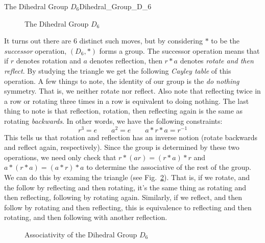 \begin{lexample}{The Dihedral Group $D_{6}$}{Dihedral_Group_D_6}
\begin{figure}[H]
            \caption{The Dihedral Group $D_{6}$}
            \label{fig:Dihedral_Group_D_6}
        \end{figure}
        It turns out there are 6 distinct such
        moves, but by considering $*$ to be the \textit{successor} operation,
        $(D_{6},*)$ forms a group. The successor operation means that if $r$
        denotes rotation and $a$ denotes reflection, then $r*a$ denotes
        \textit{rotate and then reflect}. By studying the triangle we get the
        following \textit{Cayley table} of this operation. A few things to note,
        the identity of our group is the \textit{do nothing} symmetry. That is,
        we neither rotate nor reflect. Also note that reflecting twice in a row
        or rotating three times in a row is equivalent to doing nothing. The
        last thing to note is that reflection, rotation, then reflecting again
        is the same as rotating \textit{backwards}. In other words, we have the
        following constraints:
        \begin{equation}
            r^{3}=e
            \quad\quad
            a^{2}=e
            \quad\quad
            a*r*a=r^{\minus{1}}
        \end{equation}
        This tells us that rotation and reflection has an inverse notion
        (rotate backwards and reflect again, respectively). Since the group is
        determined by these two operations, we need only check that
        $r*(ar)=(r*a)*r$ and $a*(r*a)=(a*r)*a$ to determine the associative of
        the rest of the group. We can do this by examing the triangle
        (see Fig.~\ref{fig:Assoc_of_Dihedral_Group_D6}). That is, if we
        rotate, and the follow by reflecting and then rotating, it's the same
        thing as rotating and then reflecting, following by rotating again.
        Similarly, if we reflect, and then follow by rotating and then
        reflecting, this is equivalence to reflecting and then rotating, and
        then following with another reflection.
        \begin{figure}[H]
            \centering
            \captionsetup{type=figure}
            \resizebox{\textwidth}{!}{%
                
            }
            \caption{Associativity of the Dihedral Group $D_{6}$}
            \label{fig:Assoc_of_Dihedral_Group_D6}

\end{figure}
\end{lexample}
